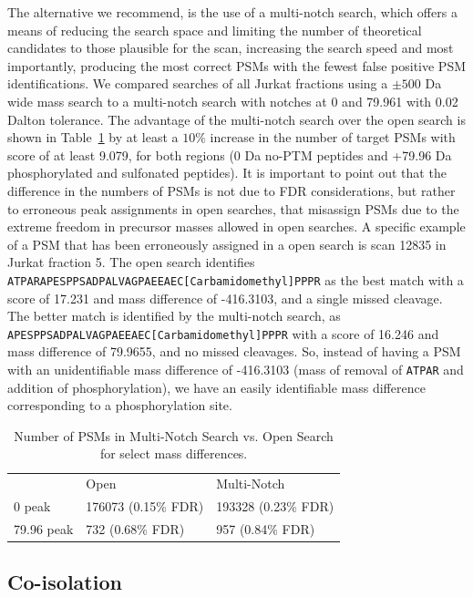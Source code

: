 \documentclass[journal=jprobs,manuscript=article]{achemso}
\begin{document}
The alternative we recommend, is the use of a multi-notch search, which offers a means of reducing the search space and limiting the number of theoretical candidates to those plausible for the scan, increasing the search speed and most importantly, producing the most correct PSMs with the fewest false positive PSM identifications.
We compared searches of all Jurkat fractions using a $\pm 500$ Da wide mass search to a multi-notch search with notches at 0 and 79.961 with 0.02 Dalton tolerance.
The advantage of the multi-notch search over the open search is shown in Table~\ref{tbl:multiVsWide} by at least a $10\%$ increase in the number of target PSMs with score of at least 9.079, for both regions (0 Da no-PTM peptides and +79.96 Da phosphorylated and sulfonated peptides).
It is important to point out that the difference in the numbers of PSMs is not due to FDR considerations, but rather to erroneous peak assignments in open searches, that misassign PSMs due to the extreme freedom in precursor masses allowed in open searches.
A specific example of a PSM that has been erroneously assigned in a open search is scan 12835 in Jurkat fraction 5.
The open search identifies \texttt{ATPARAPESPPSADPALVAGPAEEAEC[Carbamidomethyl]PPPR} as the best match with a score of 17.231 and mass difference of -416.3103, and a single missed cleavage.
The better match is identified by the multi-notch search, as \texttt{APESPPSADPALVAGPAEEAEC[Carbamidomethyl]PPPR} with a score of 16.246 and mass difference of 79.9655, and no missed cleavages.
So, instead of having a PSM with an unidentifiable mass difference of -416.3103 (mass of removal of \texttt{ATPAR} and addition of phosphorylation), we have an easily identifiable mass difference corresponding to a phosphorylation site.

\begin{table}[]
\centering
\caption{Number of PSMs in Multi-Notch Search vs. Open Search for select mass differences.}
\label{tbl:multiVsWide}
\begin{tabular}{lll}
               & Open                     & Multi-Notch         \\
0 peak         & 176073  (0.15\% FDR)     & 193328 (0.23\% FDR) \\
79.96 peak     & 732   (0.68\% FDR)       & 957  (0.84\% FDR)   \\
\end{tabular}
\end{table}

\subsection{Co-isolation}
\end{document}
